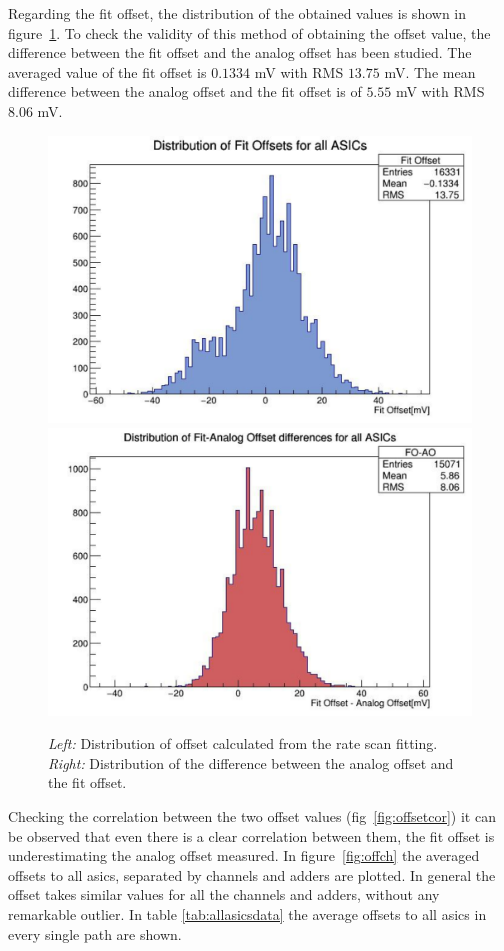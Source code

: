 \documentclass[main.tex]{subfiles}
\begin{document}
Regarding the fit offset, the distribution of the obtained values is shown in figure~\ref{fig:fitoffdist}. To check the validity of this method of obtaining the offset value, the difference between the fit offset and the analog offset has been studied. The averaged value of the fit offset is $0.1334$ mV  with RMS $13.75$ mV. The mean difference between the analog offset and the fit offset is of $5.55$ mV with RMS $8.06$ mV.
\begin{figure}[h]
  \centering
  \includegraphics[width=\textwidth]{./Pictures/fitoffsetdist.pdf}
  \endminipage
  \includegraphics[width=\textwidth]{./Pictures/diffoffsetdif.pdf}
  \endminipage
  \caption{\textit{Left:} Distribution of offset calculated from the rate scan fitting. \textit{Right:} Distribution of the difference between the analog offset and the fit offset.}
  \label{fig:fitoffdist}
\end{figure}
Checking the correlation between the two offset values (fig~\ref{fig:offsetcor}) it can be observed that even there is a clear correlation between them, the fit offset is underestimating the analog offset measured. In figure~\ref{fig:offch} the averaged offsets to all \glspl{asic}, separated by channels and adders are plotted. In general the offset takes similar values for all the channels and adders, without any remarkable outlier. In table \ref{tab:allasicsdata} the average offsets to all \glspl{asic} in every single path are shown.
\end{document}
